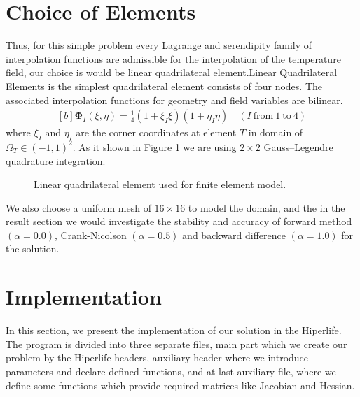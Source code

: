 \documentclass[]{article}
\begin{document}
\section{Choice of Elements} \label{sec: coe}
Thus, for this simple problem every Lagrange and serendipity family of interpolation functions are admissible for the interpolation of the temperature field, our choice is would be linear quadrilateral element.Linear  Quadrilateral Elements is the simplest quadrilateral element consists of four nodes. The associated interpolation functions for geometry and ﬁeld variables are bilinear.
\begin{equation}\label{eq16}
	\begin{aligned}[b]
		\boldsymbol{\Phi}_{I}(\xi, \eta) = \frac{1}{4}(1+\xi_I\xi)(1+\eta_I\eta) \quad (I \ \text{from} \ 1 \ \text{to} \ 4)
	\end{aligned}
\end{equation}
where $\xi_{I}$ and $\eta_{I}$ are the corner coordinates at element $T$ in domain of $\Omega_{T} \in (-1,1)^2$. As it shown in Figure \ref{fig_el} we are using $2 \times 2$ Gauss–Legendre quadrature integration.
\begin{figure}[htbp]
	\centering
	
	\caption{Linear quadrilateral element used for finite element model.}
	\label{fig_el}
\end{figure}

We also choose a uniform mesh of $16 \times 16$ to model the domain, and the in the result section we would investigate the stability and accuracy of forward method $(\alpha = 0.0)$, Crank-Nicolson $(\alpha = 0.5)$ and backward difference $(\alpha = 1.0)$ for the solution.
\section{Implementation} \label{sec: im}
In this section, we present the implementation of our solution in the Hiperlife. The program is divided into three separate files, main part which we create our problem by the Hiperlife headers, auxiliary header where we introduce parameters and declare defined functions, and at last auxiliary file, where we define some functions which provide required matrices like Jacobian and Hessian.
\end{document}
